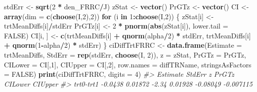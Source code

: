 \documentclass[
]{book}
\newenvironment{Shaded}{\begin{snugshade}}{\end{snugshade}}
\newcommand{\CommentTok}[1]{\textcolor[rgb]{0.56,0.35,0.01}{\textit{#1}}}
\newcommand{\ControlFlowTok}[1]{\textcolor[rgb]{0.13,0.29,0.53}{\textbf{#1}}}
\newcommand{\DataTypeTok}[1]{\textcolor[rgb]{0.13,0.29,0.53}{#1}}
\newcommand{\DecValTok}[1]{\textcolor[rgb]{0.00,0.00,0.81}{#1}}
\newcommand{\KeywordTok}[1]{\textcolor[rgb]{0.13,0.29,0.53}{\textbf{#1}}}
\newcommand{\NormalTok}[1]{#1}
\newcommand{\OperatorTok}[1]{\textcolor[rgb]{0.81,0.36,0.00}{\textbf{#1}}}
\newcommand{\OtherTok}[1]{\textcolor[rgb]{0.56,0.35,0.01}{#1}}
\newcommand{\StringTok}[1]{\textcolor[rgb]{0.31,0.60,0.02}{#1}}
\begin{document}
\begin{Shaded}
\begin{Highlighting}[]
\NormalTok{stdErr \textless{}{-}}\StringTok{ }\KeywordTok{sqrt}\NormalTok{(}\DecValTok{2} \OperatorTok{*}\StringTok{ }\NormalTok{den\_FRRC}\OperatorTok{/}\NormalTok{J)}
\NormalTok{zStat \textless{}{-}}\StringTok{ }\KeywordTok{vector}\NormalTok{()}
\NormalTok{PrGTz \textless{}{-}}\StringTok{ }\KeywordTok{vector}\NormalTok{()}
\NormalTok{CI \textless{}{-}}\StringTok{ }\KeywordTok{array}\NormalTok{(}\DataTypeTok{dim =} \KeywordTok{c}\NormalTok{(}\KeywordTok{choose}\NormalTok{(I,}\DecValTok{2}\NormalTok{),}\DecValTok{2}\NormalTok{))}
\ControlFlowTok{for}\NormalTok{ (i }\ControlFlowTok{in} \DecValTok{1}\OperatorTok{:}\KeywordTok{choose}\NormalTok{(I,}\DecValTok{2}\NormalTok{)) \{}
\NormalTok{  zStat[i] \textless{}{-}}\StringTok{ }\NormalTok{trtMeanDiffs[i]}\OperatorTok{/}\NormalTok{stdErr}
\NormalTok{  PrGTz[i] \textless{}{-}}\StringTok{ }\DecValTok{2} \OperatorTok{*}\StringTok{ }\KeywordTok{pnorm}\NormalTok{(}\KeywordTok{abs}\NormalTok{(zStat[i]), }\DataTypeTok{lower.tail =} \OtherTok{FALSE}\NormalTok{)}
\NormalTok{  CI[i, ] \textless{}{-}}\StringTok{ }\KeywordTok{c}\NormalTok{(trtMeanDiffs[i] }\OperatorTok{+}\StringTok{ }\KeywordTok{qnorm}\NormalTok{(alpha}\OperatorTok{/}\DecValTok{2}\NormalTok{) }\OperatorTok{*}\StringTok{ }\NormalTok{stdErr, }
\NormalTok{               trtMeanDiffs[i] }\OperatorTok{+}\StringTok{ }\KeywordTok{qnorm}\NormalTok{(}\DecValTok{1}\OperatorTok{{-}}\NormalTok{alpha}\OperatorTok{/}\DecValTok{2}\NormalTok{) }\OperatorTok{*}\StringTok{ }\NormalTok{stdErr)}
\NormalTok{\}}
\NormalTok{ciDiffTrtFRRC \textless{}{-}}\StringTok{ }\KeywordTok{data.frame}\NormalTok{(}\DataTypeTok{Estimate =}\NormalTok{ trtMeanDiffs, }
                            \DataTypeTok{StdErr =} \KeywordTok{rep}\NormalTok{(stdErr, }\KeywordTok{choose}\NormalTok{(I, }\DecValTok{2}\NormalTok{)),}
                            \DataTypeTok{z =}\NormalTok{ zStat, }
                            \DataTypeTok{PrGTz =}\NormalTok{ PrGTz, }
                            \DataTypeTok{CILower =}\NormalTok{ CI[,}\DecValTok{1}\NormalTok{],}
                            \DataTypeTok{CIUpper =}\NormalTok{ CI[,}\DecValTok{2}\NormalTok{], }
                            \DataTypeTok{row.names =}\NormalTok{ diffTRName,}
                            \DataTypeTok{stringsAsFactors =} \OtherTok{FALSE}\NormalTok{)}
\KeywordTok{print}\NormalTok{(ciDiffTrtFRRC, }\DataTypeTok{digits =} \DecValTok{4}\NormalTok{)}
\CommentTok{\#\textgreater{}           Estimate  StdErr     z   PrGTz  CILower   CIUpper}
\CommentTok{\#\textgreater{} trt0{-}trt1  {-}0.0438 0.01872 {-}2.34 0.01928 {-}0.08049 {-}0.007115}
\end{Highlighting}
\end{Shaded}
\end{document}
